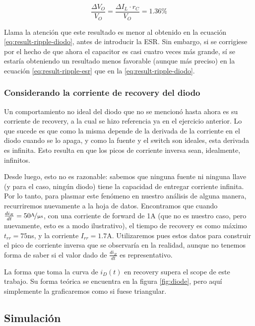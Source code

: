 \documentclass[e4_tp1_main.tex]{subfiles}
\begin{document}
\begin{equation}
	\frac{\Delta V_O}{V_O} = \frac{\Delta I_L \cdot r_C}{V_O} = 1.36 \%
	\label{eq:result-ripple-esr}
\end{equation}

Llama la atenci\'on que este resultado es menor al obtenido en la ecuaci\'on \ref{eq:result-ripple-diodo}, antes de introducir la ESR. Sin embargo, si se corrigiese por el hecho de que ahora el capacitor es casi cuatro veces m\'as grande, s\'i se estar\'ia obteniendo un resultado menos favorable (aunque m\'as preciso) en la ecuaci\'on \ref{eq:result-ripple-esr} que en la  \ref{eq:result-ripple-diodo}.


\subsubsection{Considerando la corriente de recovery del diodo}

Un comportamiento no ideal del diodo que no se mencion\'o hasta ahora es su corriente de recovery, a la cual se hizo referencia ya en el ejercicio anterior. Lo que sucede es que como la misma depende de la derivada de la corriente en el diodo cuando se lo apaga, y como la fuente y el switch son ideales, esta derivada es infinita. Esto resulta en que los picos de corriente inversa sean, idealmente, infinitos.

Desde luego, esto no es razonable: sabemos que ninguna fuente ni ninguna llave (y para el caso, ning\'un diodo) tiene la capacidad de entregar corriente infinita. Por lo tanto, para plasmar este fen\'omeno  en nuestro an\'alisis de alguna manera, recurriremos nuevamente a la hoja de datos. Encontramos que cuando $\frac{di_R}{dt} = 50\nicefrac{\text{A}}{\upmu \text{s}}$, con una corriente de forward de 1A (que no es nuestro caso, pero nuevamente, esto es a modo ilustrativo), el tiempo de recovery es como m\'aximo $t_{rr}=75$ns, y la corriente $I_{rr} = 1.7$A. Utilizaremos pues estos datos para construir el pico de corriente inversa que se observar\'ia en la realidad, aunque no tenemos forma de saber si el valor dado de $\frac{di_R}{dt}$ es representativo.

La forma que toma la curva de $i_D(t)$ en recovery supera el scope de este trabajo. Su forma te\'orica se encuentra en la figura \ref{fig:diode}, pero aqu\'i simplemente la graficaremos como si fuese triangular. 



\subsection{Simulaci\'on}
\end{document}
